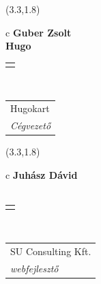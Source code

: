 \documentclass[11pt]{article}
\begin{document}
\makebox(3.3,1.8){
  \renewcommand\arraystretch{1.3}
  \begin{tabular}[c]{c}
    \hspace{8.5mm}
    \LARGE\bf{ Guber Zsolt }\\
    \hspace{8.5mm}
    \Large{ Hugo }\\
    \renewcommand\arraystretch{3}
    \begin{tabular}[c]{c}
      \centering
      \fontfamily{phv}\selectfont{
        \textbf{
          \textsc{
            \scriptsize{
            \color{Dark}{ Ismerkedő }\color{Bright}{ Webmester }\color{Bright}{ Sminkmester }\color{Bright}{ Programozó }
            }
          }
        }
      }
    \end{tabular}
    \\
    \renewcommand\arraystretch{1}
    \begin{tabular}{p{3.3in}}
      \hspace{.7cm}Hugokart\\
      \hspace{.7cm}\emph{ Cégvezető }\\
    \end{tabular}
  \end{tabular}
}

\makebox(3.3,1.8){
  \renewcommand\arraystretch{1.3}
  \begin{tabular}[c]{c}
    \hspace{8.5mm}
    \LARGE\bf{ Juhász Dávid }\\
    \hspace{8.5mm}
    \Large{  }\\
    \renewcommand\arraystretch{3}
    \begin{tabular}[c]{c}
      \centering
      \fontfamily{phv}\selectfont{
        \textbf{
          \textsc{
            \scriptsize{
            \color{Dark}{ Ismerkedő }\color{Dark}{ Webmester }\color{Bright}{ Sminkmester }\color{Dark}{ Programozó }
            }
          }
        }
      }
    \end{tabular}
    \\
    \renewcommand\arraystretch{1}
    \begin{tabular}{p{3.3in}}
      \hspace{.7cm}SU Consulting Kft.\\
      \hspace{.7cm}\emph{ webfejlesztő }\\
    \end{tabular}
  \end{tabular}
}
\end{document}
